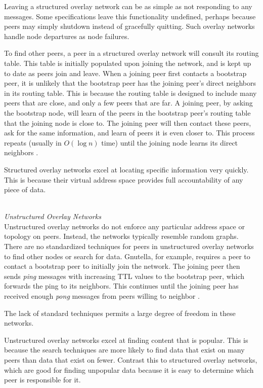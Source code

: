 \documentclass[a4paper]{article}
\begin{document}
Leaving a structured overlay network can be as simple as not responding to any messages. Some specifications leave this functionality undefined, perhaps because peers may simply shutdown instead of gracefully quitting. Such overlay networks handle node departures as node failures.

To find other peers, a peer in a structured overlay network will consult its routing table. This table is initially populated upon joining the network, and is kept up to date as peers join and leave. When a joining peer first contacts a bootstrap peer, it is unlikely that the bootstrap peer has the joining peer's direct neighbors in its routing table. This is because the routing table is designed to include many peers that are close, and only a few peers that are far. A joining peer, by asking the bootstrap node, will learn of the peers in the bootstrap peer's routing table that the joining node is close to. The joining peer will then contact these peers, ask for the same information, and learn of peers it is even closer to. This process repeats (usually in $O(\log n)$ time) until the joining node learns its direct neighbors \cite{p2pSurvey}.

Structured overlay networks excel at locating specific information very quickly. This is because their virtual address space provides full accountability of any piece of data. %

\hfill \\
\textit{Unstructured Overlay Networks}
\hfill \\

Unstructured overlay networks do not enforce any particular address space or topology on peers. Instead, the networks typically resemble random graphs. There are no standardized techniques for peers in unstructured overlay networks to find other nodes or search for data. Gnutella, for example, requires a peer to contact a bootstrap peer to initially join the network. The joining peer then sends \textit{ping} messages with increasing TTL values to the bootstrap peer, which forwards the ping to its neighbors. This continues until the joining peer has received enough \textit{pong} messages from peers willing to neighbor \cite{p2pSurvey}. %

The lack of standard techniques permits a large degree of freedom in these networks. %

Unstructured overlay networks excel at finding content that is popular. This is because the search techniques are more likely to find data that exist on many peers than data that exist on fewer. Contrast this to structured overlay networks, which are good for finding unpopular data because it is easy to determine which peer is responsible for it. %
\end{document}
